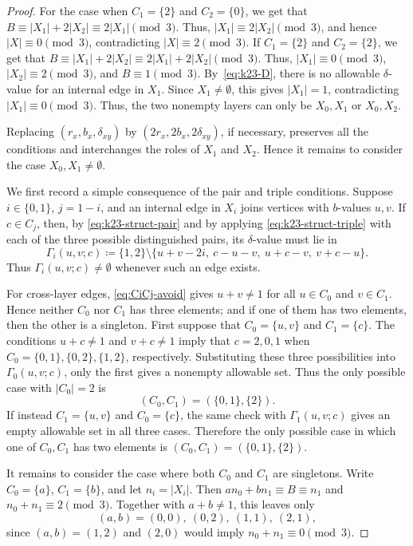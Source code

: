 \documentclass[10pt,a4paper]{amsart}
\begin{document}
\begin{proof}
    For the case when $C_1=\{2\}$ and \(C_2=\{0\}\),
    we get that $B\equiv |X_1|+2|X_2|\equiv2|X_1|\pmod3$.
    Thus, $|X_1|\equiv2|X_2|\pmod3$, and hence $|X|\equiv0\pmod3$, contradicting $|X|\equiv2\pmod3$.
    If $C_1=\{2\}$ and \(C_2=\{2\}\), we get that $B\equiv |X_1|+2|X_2|\equiv2|X_1|+2|X_2|\pmod3$.
    Thus, $|X_1|\equiv0\pmod3$, $|X_2|\equiv2\pmod3$, and $B\equiv1\pmod3$.
    By~\eqref{eq:k23-D}, there is no allowable $\delta$-value for an internal edge in $X_1$. Since $X_1\ne\emptyset$, this gives $|X_1|=1$, contradicting $|X_1|\equiv0\pmod3$.
    Thus, the two nonempty layers can only be $X_0, X_1$ or $X_0, X_2.$

    Replacing \((r_x,b_x,\delta_{xy})\) by
    \((2r_x,2b_x,2\delta_{xy})\), if necessary, preserves all the conditions
    and interchanges the roles of \(X_1\) and \(X_2\). Hence it remains to
    consider the case \(X_0,X_1\ne\emptyset\).

    We first record a simple consequence of the pair and triple conditions.
    Suppose \(i\in\{0,1\}\), \(j=1-i\), and an internal edge in \(X_i\) joins
    vertices with \(b\)-values \(u,v\). If \(c\in C_j\), then, by
    \eqref{eq:k23-struct-pair} and by applying \eqref{eq:k23-struct-triple}
    with each of the three possible distinguished pairs, its \(\delta\)-value
    must lie in
    \[
        \Gamma_i(u,v;c)
        \coloneqq
        \{1,2\}\setminus
        \{u+v-2i,\ c-u-v,\ u+c-v,\ v+c-u\}.
    \]
    Thus \(\Gamma_i(u,v;c)\ne\emptyset\) whenever such an edge exists.

    For cross-layer edges, \eqref{eq:CiCj-avoid} gives $u+v\ne1$ for all $u\in C_0$ and $v\in C_1$.
    Hence neither \(C_0\) nor \(C_1\) has three elements; and if one of them
    has two elements, then the other is a singleton.
    First suppose that \(C_0=\{u,v\}\) and \(C_1=\{c\}\).
    The conditions \(u+c\ne1\) and \(v+c\ne1\) imply that
    \(c=2,0,1\) when \(C_0=\{0,1\},\{0,2\},\{1,2\}\), respectively.
    Substituting these three possibilities into \(\Gamma_0(u,v;c)\), only the first gives a nonempty allowable set.
    Thus the only possible case with \(|C_0|=2\) is
    \[
        (C_0,C_1)=(\{0,1\},\{2\}).
    \]
    If instead \(C_1=\{u,v\}\) and \(C_0=\{c\}\), the same check with \(\Gamma_1(u,v;c)\) gives an empty allowable set in all three cases.
    Therefore the only possible case in which one of \(C_0,C_1\) has two
    elements is $(C_0,C_1)=(\{0,1\},\{2\})$.

    It remains to consider the case where both \(C_0\) and \(C_1\) are
    singletons.  Write \(C_0=\{a\}\), \(C_1=\{b\}\), and let
    \(n_i=|X_i|\).  Then $an_0+bn_1\equiv B\equiv n_1$ and $n_0+n_1\equiv2\pmod3$.
    Together with \(a+b\ne1\), this leaves only
    \[
        (a,b)=(0,0),\ (0,2),\ (1,1),\ (2,1),
    \]
    since \((a,b)=(1,2)\) and \((2,0)\) would imply
    \(n_0+n_1\equiv0\pmod3\).


\end{proof}
\end{document}
